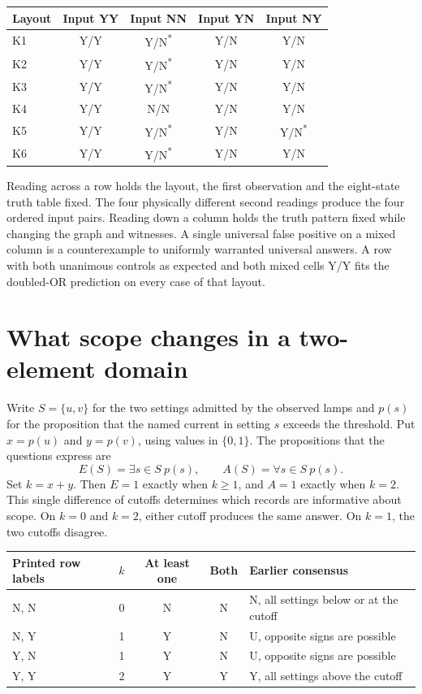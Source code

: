 \documentclass[12pt,letterpaper]{article}
\begin{document}
\begin{center}{\small\setlength{\tabcolsep}{4pt}\begin{tabularx}{\linewidth}{@{}Ycccc@{}}\toprule
Layout & Input YY & Input NN & Input YN & Input NY\\\midrule
K1 & \textsf{Y/Y} & \textsf{Y/N}\textsuperscript{*} & \textsf{Y/N} & \textsf{Y/N}\\
K2 & \textsf{Y/Y} & \textsf{Y/N}\textsuperscript{*} & \textsf{Y/N} & \textsf{Y/N}\\
K3 & \textsf{Y/Y} & \textsf{Y/N}\textsuperscript{*} & \textsf{Y/N} & \textsf{Y/N}\\
K4 & \textsf{Y/Y} & \textsf{N/N} & \textsf{Y/N} & \textsf{Y/N}\\
K5 & \textsf{Y/Y} & \textsf{Y/N}\textsuperscript{*} & \textsf{Y/N} & \textsf{Y/N}\textsuperscript{*}\\
K6 & \textsf{Y/Y} & \textsf{Y/N}\textsuperscript{*} & \textsf{Y/N} & \textsf{Y/N}\\
\bottomrule\end{tabularx}}\end{center}

Reading across a row holds the layout, the first observation and the eight-state truth table fixed. The four physically different second readings produce the four ordered input pairs. Reading down a column holds the truth pattern fixed while changing the graph and witnesses. A single universal false positive on a mixed column is a counterexample to uniformly warranted universal answers. A row with both unanimous controls as expected and both mixed cells Y/Y fits the doubled-OR prediction on every case of that layout.

\section{What scope changes in a two-element domain}
Write $S=\{u,v\}$ for the two settings admitted by the observed lamps and $p(s)$ for the proposition that the named current in setting $s$ exceeds the threshold. Put $x=p(u)$ and $y=p(v)$, using values in $\{0,1\}$. The propositions that the questions express are
\[
 E(S)=\exists s\in S\ p(s),\qquad A(S)=\forall s\in S\ p(s).
\]
Set $k=x+y$. Then $E=1$ exactly when $k\geq1$, and $A=1$ exactly when $k=2$. This single difference of cutoffs determines which records are informative about scope. On $k=0$ and $k=2$, either cutoff produces the same answer. On $k=1$, the two cutoffs disagree.

\begin{center}\small
\begin{tabularx}{\linewidth}{@{}lcccY@{}}\toprule
Printed row labels & $k$ & At least one & Both & Earlier consensus\\\midrule
N, N & 0 & N & N & N, all settings below or at the cutoff\\
N, Y & 1 & Y & N & U, opposite signs are possible\\
Y, N & 1 & Y & N & U, opposite signs are possible\\
Y, Y & 2 & Y & Y & Y, all settings above the cutoff\\\bottomrule
\end{tabularx}
\end{center}
\end{document}
